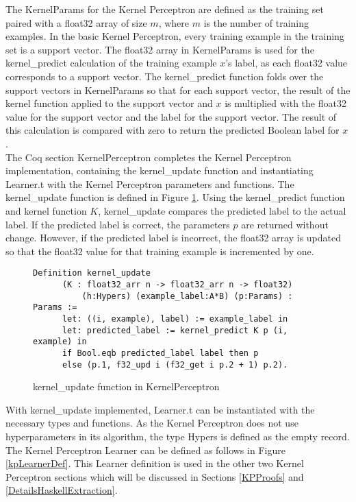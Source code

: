 The KernelParams for the Kernel Perceptron are defined as the training set paired with a float32 array of size $m$, where $m$ is the number of training examples. In the basic Kernel Perceptron, every training example in the training set is a support vector. The float32 array in KernelParams is used for the kernel\_predict calculation of the training example $x$'s label, as each float32 value corresponds to a support vector. The kernel\_predict function folds over the support vectors in KernelParams so that for each support vector, the result of the kernel function applied to the support vector and $x$ is multiplied with the float32 value for the support vector and the label for the support vector. The result of this calculation is compared with zero to return the predicted Boolean label for $x$. 
\\The Coq section KernelPerceptron completes the Kernel Perceptron implementation, containing the kernel\_update function and instantiating Learner.t with the Kernel Perceptron parameters and functions. The kernel\_update function is defined in Figure \ref{kernel_updateDef}. Using the kernel\_predict function and kernel function $K$, kernel\_update compares the predicted label to the actual label. If the predicted label is correct, the parameters $p$ are returned without change. However, if the predicted label is incorrect, the float32 array is updated so that the float32 value for that training example is incremented by one. 

\begin{figure}
    \caption{kernel\_update function in KernelPerceptron}
    \label{kernel_updateDef}
    \begin{lstlisting}
Definition kernel_update 
      (K : float32_arr n -> float32_arr n -> float32)
          (h:Hypers) (example_label:A*B) (p:Params) : Params :=
      let: ((i, example), label) := example_label in 
      let: predicted_label := kernel_predict K p (i, example) in
      if Bool.eqb predicted_label label then p
      else (p.1, f32_upd i (f32_get i p.2 + 1) p.2).
    \end{lstlisting}
\end{figure}

With kernel\_update implemented, Learner.t can be instantiated with the necessary types and functions. As the Kernel Perceptron does not use hyperparameters in its algorithm, the type Hypers is defined as the empty record. The Kernel Perceptron Learner can be defined as follows in Figure \ref{kpLearnerDef}. This Learner definition is used in the other two Kernel Perceptron sections which will be discussed in Sections \ref{KPProofs} and \ref{DetailsHaskellExtraction}.

